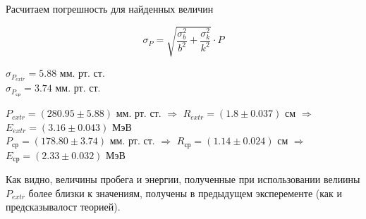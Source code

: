     Расчитаем погрешность для найденных величин

    \[ \sigma_P = \sqrt{\frac{\sigma_b^2}{b^2} + \frac{\sigma_k^2}{k^2}} \cdot P \]

    \begin{center}
        $\sigma_{P_{extr}}        = 5.88$ мм. рт. ст. \\
        $\sigma_{P_{\text{ср}}} = 3.74$ мм. рт. ст. \\
    \end{center}

    \begin{center}
        $P_{extr} = (280.95 \pm 5.88)$ мм. рт. ст. $\Rightarrow$ $R_{extr} = (1.8 \pm 0.037)$ см $\Rightarrow$ $E_{extr} = (3.16 \pm 0.043)$ МэВ\\
        $P_{\text{ср}} = (178.80 \pm 3.74)$ мм. рт. ст. $\Rightarrow$ $R_{\text{ср}} = (1.14 \pm 0.024)$ см $\Rightarrow$ $E_{\text{ср}}  = (2.33 \pm 0.032)$ МэВ
    \end{center}


    Как видно, величины пробега и энергии, полученные при использовании велиины $P_{extr}$ более близки
    к значениям, получены в предыдущем эксперементе (как и предсказывалост теорией).
